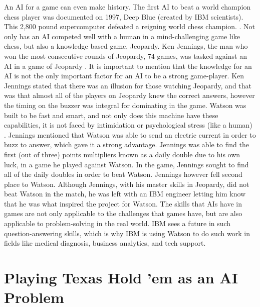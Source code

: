 \documentclass[10pt, a4paper, twocolumn]{article} %
\begin{document}
	An AI for a game can even make history. The first AI to beat a world champion chess player was documented on 1997, Deep Blue (created by IBM scientists). This 2,800 pound supercomputer defeated a reigning world chess champion. \cite{Koren, 2016}. Not only has an AI competed well with a human in a mind-challenging game like chess, but also a knowledge based game, Jeopardy. Ken Jennings, the man who won the most consecutive rounds of Jeopardy, 74 games, was tasked against an AI in a game of Jeopardy \cite{Goldenberg, 2015}. It is important to mention that the knowledge for an AI is not the only important factor for an AI to be a strong game-player. Ken Jennings stated that there was an illusion for those watching Jeopardy, and that was that almost all of the players on Jeopardy knew the correct answers, however the timing on the buzzer was integral for dominating in the game. Watson was built to be fast and smart, and not only does this machine have these capabilities, it is not faced by intimidation or psychological stress (like a human) \cite{Jennings, 2011}. Jennings mentioned that Watson was able to send an electric current in order to buzz to answer, which gave it a strong advantage. Jennings was able to find the first (out of three) points multipliers known as a daily double due to his own luck, in a game he played against Watson. In the game, Jennings sought to find all of the daily doubles in order to beat Watson. Jennings however fell second place to Watson. Although Jennings, with his master skills in Jeopardy, did not beat Watson in the match, he was left with an IBM engineer letting him know that he was what inspired the project for Watson. The skills that AIs have in games are not only applicable to the challenges that games have, but are also applicable to problem-solving in the real world. IBM sees a future in such question-answering skills, which is why IBM is using Watson to do such work in fields like medical diagnosis, business analytics, and tech support.



\section{Playing Texas Hold 'em as an AI Problem}
\end{document}
